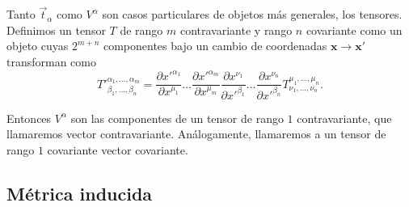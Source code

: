 Tanto $\vec{t}_{\alpha}$ como $V^{\alpha}$ son casos particulares de objetos
más generales, los tensores. Definimos un tensor $T$ de rango $m$
contravariante y rango $n$ covariante como un objeto cuyas $2^{m+n}$ componentes
bajo un cambio de coordenadas $\mathbf{x}\rightarrow\mathbf{x'}$ transforman
como 
\begin{equation*}
T'^{\alpha_1,\dots,\alpha_m}_{\beta_1,\dots,\beta_n}=
\frac{\partial x'^{\alpha_1}}{\partial x^{\mu_1}}\dots \frac{\partial
  x'^{\alpha_m}}{\partial x^{\mu_m}}
\frac{\partial x^{\nu_1}}{\partial x'^{\beta_1}}\dots \frac{\partial
  x^{\nu_n}}{\partial x'^{\beta_n}}T^{\mu_1,\dots,\mu_n}_{\nu_1,\dots,\nu_n} .
\end{equation*}

Entonces $V^{\alpha}$ son las componentes de un tensor de rango $1$
contravariante, que llamaremos vector contravariante. Análogamente,
llamaremos a un tensor de rango $1$ covariante vector covariante.
 
\subsection{Métrica inducida}

